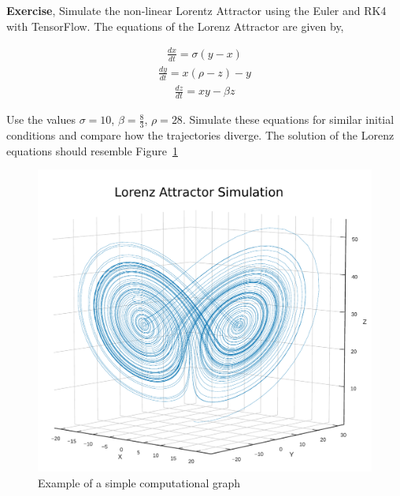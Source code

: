 \documentclass[10pt,letterpaper]{article}
\begin{document}
\textbf{Exercise}, Simulate the non-linear Lorentz Attractor using the Euler and RK4 with TensorFlow. The equations of the Lorenz Attractor are given by,

\begin{eqnarray}\frac{dx}{dt}=\sigma(y-x) \end{eqnarray}
\begin{eqnarray}\frac{dy}{dt}=x(\rho-z)-y \end{eqnarray}
\begin{eqnarray}\frac{dz}{dt}=xy-\beta z \end{eqnarray}

Use the values $\sigma =10$, $\beta =\frac{8}{3}$, $\rho =28$. Simulate these equations for similar initial conditions and compare how the trajectories diverge. The solution of the Lorenz equations should resemble Figure~\ref{fig:Lorenz}
 
\begin{figure}[H]
\begin{center}
\includegraphics[scale=0.5]{Figures/fig6_op.pdf} 
\caption{Example of a simple computational graph}
\label{fig:Lorenz}
\end{center}

\end{figure}
\end{document}
